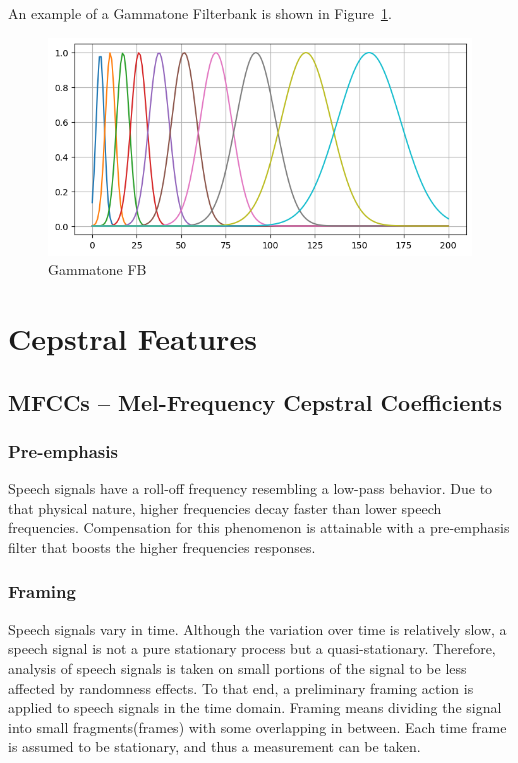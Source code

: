 An example of a Gammatone Filterbank
is shown in Figure~\ref{fig:sb_fb_gauss}.
\begin{figure}[H]
    \centering
    \includegraphics[width=0.75\linewidth]{Features/images/sb_fb_gauss}
    \caption{Gammatone FB}\label{fig:sb_fb_gauss}
\end{figure}


\section{Cepstral Features}
\subsection{MFCCs -- Mel-Frequency Cepstral Coefficients}

\subsubsection{Pre-emphasis}
Speech signals have a roll-off frequency 
resembling a low-pass behavior\cite{237532}.
Due to that physical nature, higher frequencies 
decay faster than lower speech frequencies.
Compensation for this phenomenon is attainable with a 
pre-emphasis filter that boosts 
the higher\cite{7489370} frequencies responses.


\subsubsection{Framing}
Speech signals vary in time. 
Although the variation over time is relatively slow, 
a speech signal is not a pure stationary process 
but a quasi-stationary. 
Therefore, analysis of speech signals 
is taken on small portions of the 
signal to be less affected by randomness effects.
To that end, a preliminary framing action is applied
to speech signals in the time domain.
Framing means dividing the signal 
into small fragments(frames) with some overlapping in between.
Each time frame is assumed to be stationary,
and thus a measurement can be taken.

